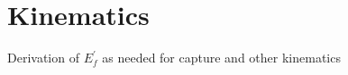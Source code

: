 \graphicspath{{img/appendix_1/}}

\chapter{Kinematics}
\label{appendix:Kinematics}

\begin{synopsis}
  Derivation of $E_f^{'}$ as needed for capture and other kinematics
\end{synopsis}
